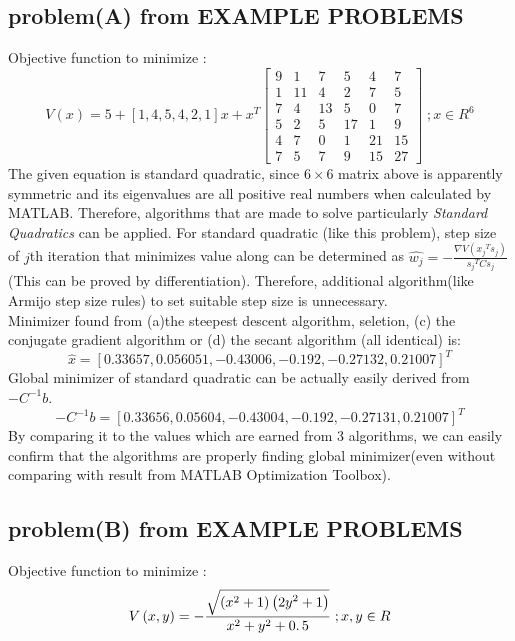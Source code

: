 \documentclass[twoside,11pt]{article}
\begin{document}
\subsection*{problem(A) from EXAMPLE PROBLEMS}
Objective function to minimize :
\begin{equation}
    V\left(x\right)=5+\left\lbrack 1,4,5,4,2,1\right\rbrack x+x^T \left\lbrack \begin{array}{cccccc}
9 & 1 & 7 & 5 & 4 & 7\\
1 & 11 & 4 & 2 & 7 & 5\\
7 & 4 & 13 & 5 & 0 & 7\\
5 & 2 & 5 & 17 & 1 & 9\\
4 & 7 & 0 & 1 & 21 & 15\\
7 & 5 & 7 & 9 & 15 & 27
\end{array}\right\rbrack \;;x\in R^6
\end{equation}
The given equation is standard quadratic, since $6\times 6$ matrix above is apparently symmetric and its eigenvalues are all positive real numbers when calculated by MATLAB. Therefore, algorithms that are made to solve particularly \textit{Standard Quadratics} can be applied. 
For standard quadratic (like this problem), step size of $j$th iteration  that minimizes value along can be determined as $\hat{w_j } =-\frac{\nabla V\left({x_j}^T s_j \right)}{{s_j}^T C{s_j} }$(This can be proved by differentiation). Therefore, additional algorithm(like Armijo step size rules) to set suitable step size is unnecessary. \\
Minimizer found from (a)the steepest descent algorithm,  seletion, (c) the conjugate gradient algorithm or (d) the secant algorithm (all identical) is:
\begin{equation}
    \hat{x} = [0.33657, 0.056051, -0.43006, -0.192, -0.27132, 0.21007]^T
\end{equation}
Global minimizer of standard quadratic can be actually easily derived from $-C^{-1}b$.
\begin{equation}
    -C^{-1} b = [0.33656, 0.05604, -0.43004, -0.192, -0.27131, 0.21007]^T
\end{equation}
By comparing it to the values which are earned from 3 algorithms, we can easily confirm that the algorithms are properly finding global minimizer(even without comparing with result from MATLAB Optimization Toolbox).


\subsection*{problem(B) from EXAMPLE PROBLEMS}
Objective function to minimize :
\begin{equation}
    V\left(x,y\right)=-\frac{\sqrt{\left(x^2 +1\right)\left({2y}^2 +1\right)}}{x^2 +y^2 +0\ldotp 5}\;;x,y\in R
\end{equation}
\end{document}
